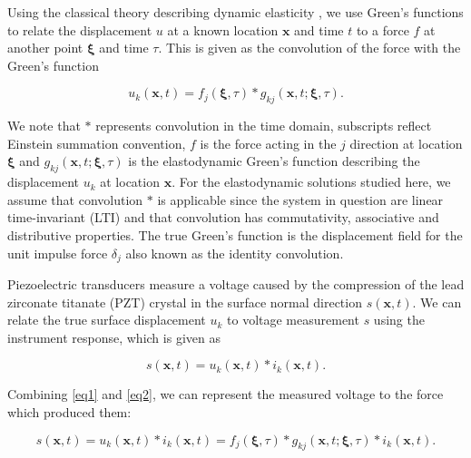 \documentclass[preprint,3p, 11pt,authoryear]{elsarticle}
\begin{document}
Using the classical theory describing dynamic elasticity \citep{Aki2002}, we use Green's functions to relate the displacement $u$ at a known location $\mathbf{x}$ and time $t$ to a force $f$ at another point $\mathbf{\xi}$ and time $\tau$. This is given as the convolution of the force with the Green's function

\begin{equation}
\label{eq1}
           u_{k}\left( \mathbf{x}, t \right)  =  
            f_{j}\left( \mathbf{\xi}, \tau \right) \ast 
            g_{kj}\left( \mathbf{x}, t;\mathbf{\xi}, \tau \right).
\end{equation}

\noindent We note that $\ast$ represents convolution in the time domain, subscripts reflect Einstein summation convention, $f$ is the force acting in the $j$ direction at location $\mathbf{\xi}$ and $g_{kj}\left( \mathbf{x}, t;\mathbf{\xi}, \tau \right)$ is the elastodynamic Green's function describing the displacement $u_{k}$ at location $\mathbf{x}$. For the elastodynamic solutions studied here, we assume that convolution $\ast$ is applicable since the system in question are linear time-invariant (LTI) and that convolution has commutativity, associative and distributive properties. The true Green's function is the displacement field for the unit impulse force $\delta_{j}$ also known as the identity convolution. 

Piezoelectric transducers measure a voltage caused by the compression of the lead zirconate titanate (PZT) crystal in the surface normal direction $s\left( \mathbf{x}, t \right)$. We can relate the true surface displacement $u_{k}$ to voltage measurement $s$ using the instrument response, which is given as

   \begin{equation}
    \label{eq2}
        s\left( \mathbf{x}, t \right) =
            u_{k}\left( \mathbf{x}, t \right) \ast i_{k}\left(\mathbf{x},t \right).
    \end{equation}
    
    \noindent Combining \eqref{eq1} and \eqref{eq2}, we can represent the measured voltage to the force which produced them:

    \begin{equation}
    \label{eq3}
        s\left( \mathbf{x}, t \right) =
            u_{k}\left( \mathbf{x}, t \right) \ast i_{k}\left(\mathbf{x}, t \right) =  
                f_{j}\left( \mathbf{\xi}, \tau \right) \ast 
                g_{kj}\left( \mathbf{x}, t;\mathbf{\xi}, \tau \right) \ast i_{k}\left(\mathbf{x},  t \right).
    \end{equation}
\end{document}
